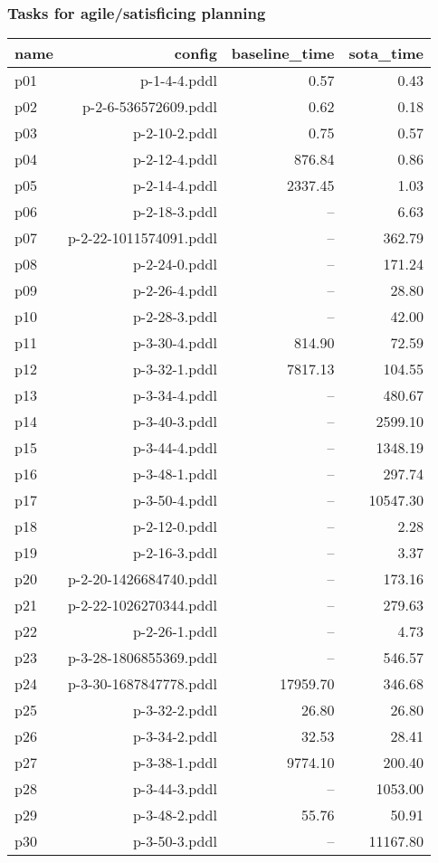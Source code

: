 \documentclass{article}
\begin{document}
                    \subsubsection*{Tasks for agile/satisficing planning}
                    
                            \begin{center}
                            \scriptsize
                            \begin{tabular}{@{}l|r|r|r@{}}
                            name & config & baseline\_time & sota\_time\\\midrule
                              p01& p-1-4-4.pddl&0.57&0.43\\
  p02& p-2-6-536572609.pddl&0.62&0.18\\
  p03& p-2-10-2.pddl&0.75&0.57\\
  p04& p-2-12-4.pddl&876.84&0.86\\
  p05& p-2-14-4.pddl&2337.45&1.03\\
  p06& p-2-18-3.pddl&--&6.63\\
  p07& p-2-22-1011574091.pddl&--&362.79\\
  p08& p-2-24-0.pddl&--&171.24\\
  p09& p-2-26-4.pddl&--&28.80\\
  p10& p-2-28-3.pddl&--&42.00\\
  p11& p-3-30-4.pddl&814.90&72.59\\
  p12& p-3-32-1.pddl&7817.13&104.55\\
  p13& p-3-34-4.pddl&--&480.67\\
  p14& p-3-40-3.pddl&--&2599.10\\
  p15& p-3-44-4.pddl&--&1348.19\\
  p16& p-3-48-1.pddl&--&297.74\\
  p17& p-3-50-4.pddl&--&10547.30\\
  p18& p-2-12-0.pddl&--&2.28\\
  p19& p-2-16-3.pddl&--&3.37\\
  p20& p-2-20-1426684740.pddl&--&173.16\\
  p21& p-2-22-1026270344.pddl&--&279.63\\
  p22& p-2-26-1.pddl&--&4.73\\
  p23& p-3-28-1806855369.pddl&--&546.57\\
  p24& p-3-30-1687847778.pddl&17959.70&346.68\\
  p25& p-3-32-2.pddl&26.80&26.80\\
  p26& p-3-34-2.pddl&32.53&28.41\\
  p27& p-3-38-1.pddl&9774.10&200.40\\
  p28& p-3-44-3.pddl&--&1053.00\\
  p29& p-3-48-2.pddl&55.76&50.91\\
  p30& p-3-50-3.pddl&--&11167.80
                            \end{tabular}
                            \end{center}
                    
\end{document}
